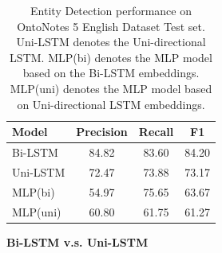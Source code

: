 \documentclass{article}
\begin{document}
\begin{table}[t]
	\centering
	\begin{tabular}{l@{\qquad}ccc}
		\toprule
		\textbf{Model}         & \textbf{Precision} & \textbf{Recall} & \textbf{F1} \\ \midrule
		Bi-LSTM &  84.82 & 83.60  & 84.20 \\
		Uni-LSTM & 72.47 & 73.88 & 73.17 \\
		MLP(bi) & 54.97 & 75.65 & 63.67 \\ 
		MLP(uni) & 60.80 & 61.75 &  61.27 \\ 
		\bottomrule
	\end{tabular}
	\vspace{3mm}
	\caption{Entity Detection performance on OntoNotes 5 English Dataset Test set. Uni-LSTM denotes the Uni-directional LSTM. MLP(bi) denotes the MLP model based on the Bi-LSTM embeddings. MLP(uni) denotes the MLP model based on Uni-directional LSTM embeddings.}
	\label{res:ner}
\end{table}


\noindent \textbf{Bi-LSTM v.s. Uni-LSTM}
\end{document}

